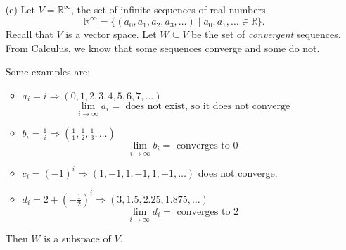 \documentclass[11pt]{article}
\begin{document}
\begin{enumerate}
        \begin{proof}
            Effectively, it is sufficient to show that $X$ is a subspace of $U$.
            \begin{enumerate}
                \item[(1)] The zero function \(f(x) = 0\) is differentiable since \[f'(x) = 0 \text{ and } f'\left(\frac{1}{2}\right) = 0.\] So \(f \in X\).
                \item[(2)] Given \(f,g \in X\), we must check that \(f + g \in X\). Clearly \(f + g\) is differentiable. We must check that \((f + g)' \left( \frac{1}{2} \right) = 0.\) From Calculus, we have
                \begin{align*}
                    (f+g)'\left(\frac{1}{2}\right) &= f'\left(\frac{1}{2}\right) + g' \left(\frac{1}{2}\right) \\
                    &= 0 + 0 \\
                    &= 0.
                \end{align*}
                So we have \(f + g \in X\).
                \item[(3)] Similar proof as follows for scalar multiplication: \[ (kg)' \left(\frac{1}{2}\right) = k \cdot f' \left(\frac{1}{2}\right) = 0. \] 
            \end{enumerate}
        \end{proof}

        \item[(e)] Let \(V = \mathbb{R}^{\infty}\), the set of infinite sequences of real numbers. \[\mathbb{R}^{\infty} = \{(a_0,a_1,a_2,a_3, \dots) \mid a_0,a_1, \dots \in \mathbb{R}\}.\] Recall that $V$ is a vector space. Let $W \subseteq V$ be the set of \emph{convergent} sequences. From Calculus, we know that some sequences converge and some do not.
        
        Some examples are:
        \begin{itemize}
            \item \(a_i = i \Rightarrow (0,1,2,3,4,5,6,7, \dots)\) \[\lim_{i \to \infty} a_i =\text{ does not exist, so it does not converge}\]
            \item \(b_i = \frac{1}{i} \Rightarrow (\frac{1}{1}, \frac{1}{2}, \frac{1}{3}, \dots)\) \[ \lim_{i \to \infty} b_i = \text{ converges to 0} \]
            \item \(c_i = (-1)^i \Rightarrow (1, -1, 1, -1, 1, -1, \dots)\) does not converge.
            \item \(d_i = 2 + \left( - \frac{1}{2} \right)^i \Rightarrow (3, 1.5, 2.25, 1.875, \dots)\) \[\lim_{i \to \infty} d_i = \text{ converges to 2}\]
        \end{itemize}
        Then $W$ is a subspace of $V$.


\end{enumerate}
\end{document}
